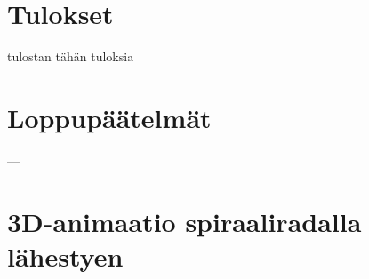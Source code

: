 \documentclass[12pt,a4paper]{article}
\begin{document}
\section{Tulokset}
tulostan tähän tuloksia


\section{Loppupäätelmät}
---




\appendix
%
\newpage
\section{3D-animaatio spiraaliradalla lähestyen} \label{koodi:volume-spiraali}

\end{document}
